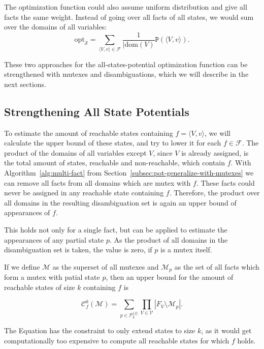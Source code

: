 The optimization function could also assume uniform distribution and give all facts the same weight.
Instead of going over all facts of all states, we would sum over the domains of all variables:
\begin{equation} \mathrm{opt}_\mathcal{S}=\sum_{\langle V,v \rangle\in\mathcal{F}}\frac{1}{|\mathrm{dom}(V)}\mathtt{P}(\langle V,v \rangle).\end{equation}

These two approaches for the all-states-potential optimization function can be strengthened with mutexes and disambiguations, which we will describe in the next sections.

\subsection{Strengthening All State Potentials}\label{subsec:strengthening-all-state-potential}
To estimate the amount of reachable states containing $f=\langle V,v \rangle$, we will calculate the upper bound of these states, and try to lower it for each $f\in\mathcal{F}$.
The product of the domains of all variables except $V$, since $V$ is already assigned, is the total amount of states, reachable and non-reachable, which contain $f$.
With Algorithm~\ref{alg:multi-fact} from Section~\ref{subsec:pot-generalize-with-mutexes} we can remove all facts from all domains which are mutex with $f$.
These facts could never be assigned in any reachable state containing $f$.
Therefore, the product over all domains in the resulting disambiguation set is again an upper bound of appearances of $f$.

This holds not only for a single fact, but can be applied to estimate the appearances of any partial state $p$.
As the product of all domains in the disambiguation set is taken, the value is zero, if $p$ is a mutex itself.

If we define $\mathcal{M}$ as the superset of all mutexes and $\mathcal{M}_p$ as the set of all facts which form a mutex with patial state $p$, then an upper bound for the amount of reachable states of size $k$ containing $f$ is

\begin{equation}
    \mathcal{C}_f^k(\mathcal{M}) = \sum_{p\in\mathcal{P}_k^{\{f\}}}\prod_{V\in\mathcal{V}} |F_V\setminus\mathcal{M}_p|
.\label{eq:ckf}\end{equation}

The Equation has the constraint to only extend states to size $k$, as it would get computationally too expensive to compute all reachable states for which $f$ holds.

